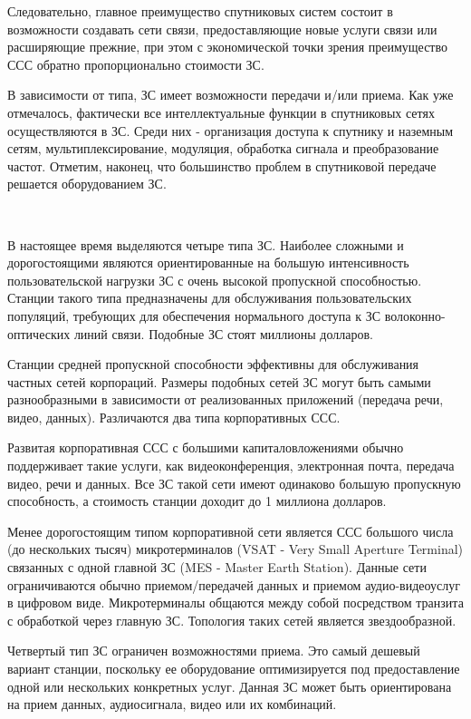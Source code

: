 \documentclass[a4paper]{report}
\begin{document}
Следовательно, главное преимущество спутниковых систем состоит в возможности создавать сети связи, предоставляющие новые услуги связи или расширяющие прежние, при этом с экономической точки зрения преимущество ССС обратно пропорционально стоимости ЗС.

В зависимости от типа, ЗС имеет возможности передачи и/или приема. Как уже отмечалось, фактически все интеллектуальные функции в спутниковых сетях осуществляются в ЗС. Среди них - организация доступа к спутнику и наземным сетям, мультиплексирование, модуляция, обработка сигнала и преобразование частот. Отметим, наконец, что большинство проблем в спутниковой передаче решается оборудованием ЗС.

~

В настоящее время выделяются четыре типа ЗС. Наиболее сложными и дорогостоящими являются ориентированные на большую интенсивность пользовательской нагрузки ЗС с очень высокой пропускной способностью. Станции такого типа предназначены для обслуживания пользовательских популяций, требующих для обеспечения нормального доступа к ЗС волоконно-оптических линий связи. Подобные ЗС стоят миллионы долларов.

Станции средней пропускной способности эффективны для обслуживания частных сетей корпораций. Размеры подобных сетей ЗС могут быть самыми разнообразными в зависимости от реализованных приложений (передача речи, видео, данных). Различаются два типа корпоративных ССС.

Развитая корпоративная ССС с большими капиталовложениями обычно поддерживает такие услуги, как видеоконференция, электронная почта, передача видео, речи и данных. Все ЗС такой сети имеют одинаково большую пропускную способность, а стоимость станции доходит до 1 миллиона долларов.

Менее дорогостоящим типом корпоративной сети является ССС большого числа (до нескольких тысяч) микротерминалов (VSAT - Very Small Aperture Terminal) связанных с одной главной ЗС (MES - Master Earth Station). Данные сети ограничиваются обычно приемом/передачей данных и приемом аудио-видеоуслуг в цифровом виде. Микротерминалы общаются между собой посредством транзита с обработкой через главную ЗС. Топология таких сетей является звездообразной.

Четвертый тип ЗС ограничен возможностями приема. Это самый дешевый вариант станции, поскольку ее оборудование оптимизируется под предоставление одной или нескольких конкретных услуг. Данная ЗС может быть ориентирована на прием данных, аудиосигнала, видео или их комбинаций.
\end{document}
